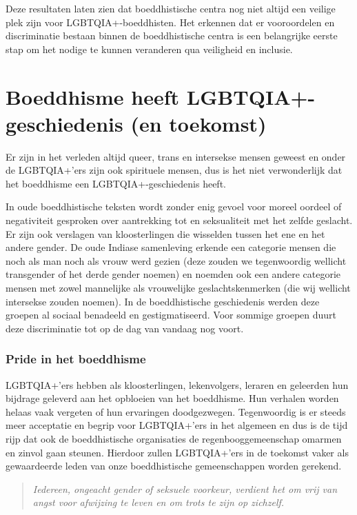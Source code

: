 \documentclass[12pt,openany]{book}
\begin{document}
Deze resultaten laten zien dat boeddhistische centra nog niet altijd een veilige plek zijn voor LGBTQIA+-boeddhisten. Het erkennen dat er vooroordelen en discriminatie bestaan binnen de boeddhistische centra is een belangrijke eerste stap om het nodige te kunnen veranderen qua veiligheid en inclusie.

\section*{Boeddhisme heeft LGBTQIA+-geschiedenis (en toekomst)}

Er zijn in het verleden altijd queer, trans en intersekse mensen geweest en onder de LGBTQIA+’ers zijn ook spirituele mensen, dus is het niet verwonderlijk dat het boeddhisme een LGBTQIA+-geschiedenis heeft.

In oude boeddhistische teksten wordt zonder enig gevoel voor moreel oordeel of negativiteit gesproken over aantrekking tot en seksualiteit met het zelfde geslacht. Er zijn ook verslagen van kloosterlingen die wisselden tussen het ene en het andere gender. De oude Indiase samenleving erkende een categorie mensen die noch als man noch als vrouw werd gezien (deze zouden we tegenwoordig wellicht transgender of het derde gender noemen) en noemden ook een andere categorie mensen met zowel mannelijke als vrouwelijke geslachtskenmerken (die wij wellicht intersekse zouden noemen). In de boeddhistische geschiedenis werden deze groepen al sociaal benadeeld en gestigmatiseerd. Voor sommige groepen duurt deze discriminatie tot op de dag van vandaag nog voort.

\subsubsection*{Pride in het boeddhisme}

LGBTQIA+'ers hebben als kloosterlingen, lekenvolgers, leraren en geleerden hun bijdrage geleverd aan het opbloeien van het boeddhisme. Hun verhalen worden helaas vaak vergeten of hun ervaringen doodgezwegen. Tegenwoordig is er steeds meer acceptatie en begrip voor LGBTQIA+’ers in het algemeen en dus is de tijd rijp dat ook de boeddhistische organisaties de regenbooggemeenschap omarmen en zinvol gaan steunen. Hierdoor zullen LGBTQIA+’ers in de toekomst vaker als gewaardeerde leden van onze boeddhistische gemeenschappen worden gerekend.

\begin{quote}
\textit{Iedereen, ongeacht gender of seksuele voorkeur, verdient het om vrij van angst voor afwijzing te leven en om trots te zijn op zichzelf.}
\end{quote}
\end{document}
